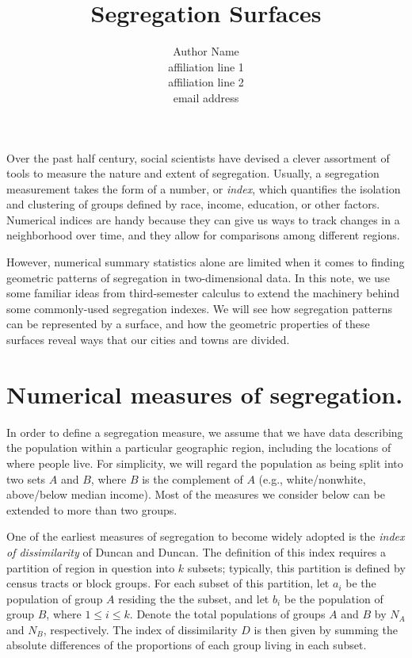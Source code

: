 \documentclass{article}
\theoremstyle{theorem}
\theoremstyle{definition}
\begin{document}
\title{Segregation Surfaces}

\author{Author Name\\               %
\scriptsize affiliation line 1\\    %
affiliation line 2\\                %
email address}                      %

\maketitle

\noindent Over the past half century, social scientists have devised a clever assortment of tools to measure the nature and extent of segregation. \cite{harrisjohnson18} Usually, a segregation measurement takes the form of a number, or \textit{index}, which quantifies the isolation and clustering of groups defined by race, income, education, or other factors. Numerical indices are handy because they can give us ways to track changes in a neighborhood over time, and they allow for comparisons among different regions.

However, numerical summary statistics alone are limited when it comes to finding geometric patterns of segregation in two-dimensional data. In this note, we use some familiar ideas from third-semester calculus to extend the machinery behind some commonly-used segregation indexes. We will see how segregation patterns can be represented by a surface, and how the geometric properties of these surfaces reveal ways that our cities and towns are divided.

\section{Numerical measures of segregation.}

In order to define a segregation measure, we assume that we have data describing the population within a particular geographic region, including the locations of where people live. For simplicity, we will regard the population as being split into two sets $A$ and $B$, where $B$ is the complement of $A$ (e.g., white/nonwhite, above/below median income). Most of the measures we consider below can be extended to more than two groups.

One of the earliest measures of segregation to become widely adopted is the \textit{index of dissimilarity} of Duncan and Duncan. \cite{duncan55} The definition of this index requires a partition of region in question into $k$ subsets; typically, this partition is defined by census tracts or block groups. For each subset of this partition, let $a_i$ be the population of group $A$ residing the the subset, and let $b_i$ be the population of group $B$, where $1 \leq i \leq k$. Denote the total populations of groups $A$ and $B$ by $N_A$ and $N_B$, respectively. The index of dissimilarity $D$ is then given by summing the absolute differences of the proportions of each group living in each subset.
\end{document}

